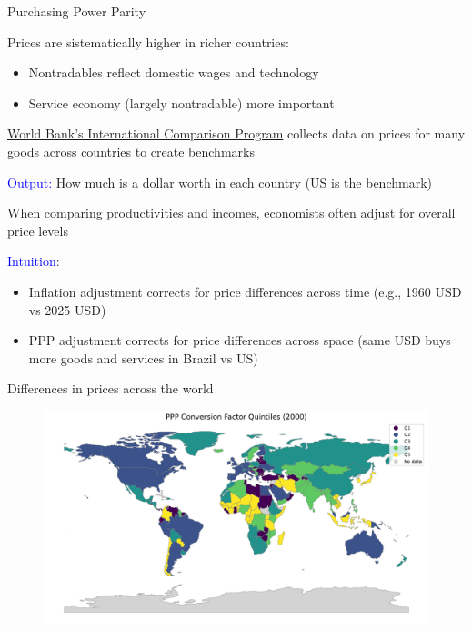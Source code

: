 \documentclass[notes,11pt, aspectratio=169, xcolor=table]{beamer}
\newcommand{\blue}[1]{\textcolor{blue}{#1}}
\newenvironment{wideitemize}{\itemize\addtolength{\itemsep}{10pt}}{\enditemize}
\begin{document}
\begin{frame}{Purchasing Power Parity}
    \begin{wideitemize}
        \item Prices are sistematically higher in richer countries:
        \begin{itemize}
            \item Nontradables reflect domestic wages and technology
            \item Service economy (largely nontradable) more important
        \end{itemize}


        \item \href{https://www.worldbank.org/en/programs/icp}{World Bank's International Comparison Program} collects data on prices for many goods across countries to create benchmarks 

        \item \blue{Output:} How much is a dollar worth in each country (US is the benchmark)

        \item When comparing productivities and incomes, economists often adjust for overall price levels

        \item \blue{Intuition}:
            \begin{itemize}
                \item Inflation adjustment corrects for price differences across time (e.g., 1960 USD vs 2025 USD)
                \item PPP adjustment corrects for price differences across space (same USD buys more goods and services in Brazil vs US)
            \end{itemize}

    \end{wideitemize}
\end{frame}

\begin{frame}{Differences in prices across the world}
    \begin{figure}
        \centering
        \includegraphics[width=0.9\linewidth]{figs/PPP_world_map_quintiles.pdf}
    \end{figure}
\end{frame}
\end{document}
